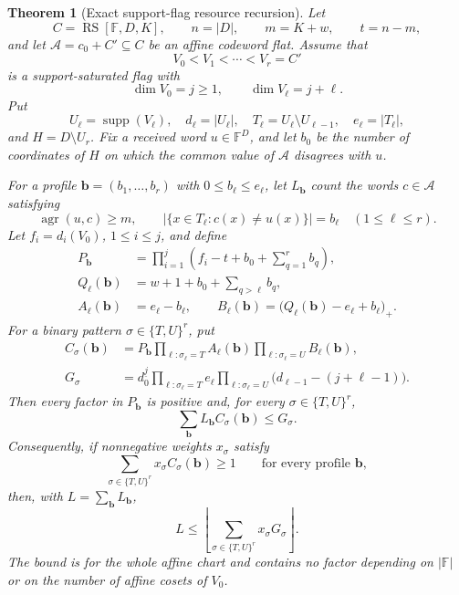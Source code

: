 \documentclass[11pt,a4paper]{amsart}
\numberwithin{equation}{section}
\newtheorem{theorem}{Theorem}[section]
\theoremstyle{remark}
\DeclareMathOperator{\RS}{RS}\DeclareMathOperator{\MCA}{MCA}\DeclareMathOperator{\CA}{CA}
\DeclareMathOperator{\supp}{supp}\DeclareMathOperator{\Fib}{Fib}\DeclareMathOperator{\Sym}{Sym}
\newcommand{\F}{\mathbb F}\newcommand{\B}{\mathbb B}\newcommand{\K}{\mathbb K}\newcommand{\Z}{\mathbb Z}
\begin{document}
\begin{theorem}[Exact support-flag resource recursion]
\label{thm:support-flag-recursion}
Let
\[
 C=\RS[\F,D,K],\qquad n=|D|,\qquad m=K+w,\qquad t=n-m,
\]
and let $\mathcal A=c_0+C'\subseteq C$ be an affine codeword flat.
Assume that
\[
 V_0<V_1<\cdots<V_r=C'
\]
is a support-saturated flag with
\[
 \dim V_0=j\ge1,
 \qquad \dim V_\ell=j+\ell.
\]
Put
\[
 U_\ell=\supp(V_\ell),\quad d_\ell=|U_\ell|,
 \quad T_\ell=U_\ell\setminus U_{\ell-1},
 \quad e_\ell=|T_\ell|,
\]
and $H=D\setminus U_r$.  Fix a received word $u\in\F^D$, and let
$b_0$ be the number of coordinates of $H$ on which the common value of
$\mathcal A$ disagrees with $u$.

For a profile
$\mathbf b=(b_1,\ldots,b_r)$ with $0\le b_\ell\le e_\ell$, let
$L_{\mathbf b}$ count the words $c\in\mathcal A$ satisfying
\[
 \operatorname{agr}(u,c)\ge m,
 \qquad
 |\{x\in T_\ell:c(x)\ne u(x)\}|=b_\ell
 \quad(1\le\ell\le r).
\]
Let $f_i=d_i(V_0)$, $1\le i\le j$, and define
\begin{align}
 P_{\mathbf b}
 &=\prod_{i=1}^{j}
   \left(f_i-t+b_0+\sum_{q=1}^{r}b_q\right),
 \label{eq:flag-profile-P}\\
 Q_\ell(\mathbf b)
 &=w+1+b_0+\sum_{q>\ell}b_q,
 \label{eq:flag-profile-Q}\\
 A_\ell(\mathbf b)&=e_\ell-b_\ell,
 \qquad
 B_\ell(\mathbf b)
 =\bigl(Q_\ell(\mathbf b)-e_\ell+b_\ell\bigr)_+.
 \label{eq:flag-profile-AB}
\end{align}
For a binary pattern $\sigma\in\{T,U\}^r$, put
\begin{align}
 C_\sigma(\mathbf b)
 &=P_{\mathbf b}
   \prod_{\ell:\sigma_\ell=T}A_\ell(\mathbf b)
   \prod_{\ell:\sigma_\ell=U}B_\ell(\mathbf b),
 \label{eq:flag-profile-resource}\\
 G_\sigma
 &=d_0^{\underline j}
   \prod_{\ell:\sigma_\ell=T}e_\ell
   \prod_{\ell:\sigma_\ell=U}
   \bigl(d_{\ell-1}-(j+\ell-1)\bigr).
 \label{eq:flag-global-resource}
\end{align}
Then every factor in $P_{\mathbf b}$ is positive and, for every
$\sigma\in\{T,U\}^r$,
\begin{equation}
 \boxed{
 \sum_{\mathbf b}L_{\mathbf b}C_\sigma(\mathbf b)
 \le G_\sigma.}
 \label{eq:flag-resource-inequality}
\end{equation}
Consequently, if nonnegative weights $x_\sigma$ satisfy
\begin{equation}
 \sum_{\sigma\in\{T,U\}^r}
 x_\sigma C_\sigma(\mathbf b)\ge1
 \qquad
 \text{for every profile }\mathbf b,
 \label{eq:flag-dual-feasible}
\end{equation}
then, with $L=\sum_{\mathbf b}L_{\mathbf b}$,
\begin{equation}
 \boxed{
 L\le
 \left\lfloor
 \sum_{\sigma\in\{T,U\}^r}x_\sigma G_\sigma
 \right\rfloor.}
 \label{eq:flag-dual-bound}
\end{equation}
The bound is for the whole affine chart and contains no factor depending
on $|\F|$ or on the number of affine cosets of $V_0$.
\end{theorem}
\end{document}

